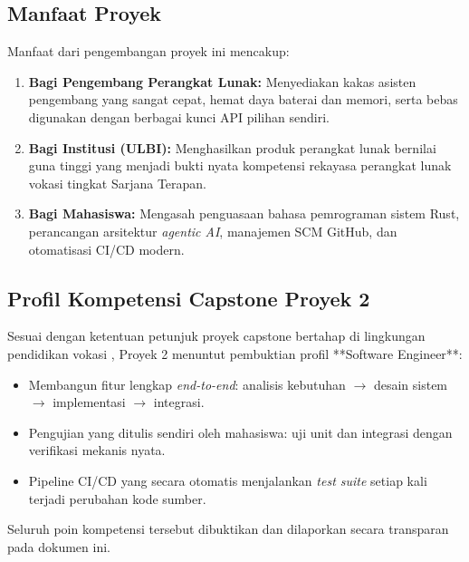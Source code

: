 \subsection{Manfaat Proyek}
Manfaat dari pengembangan proyek ini mencakup:
\begin{enumerate}
    \item \textbf{Bagi Pengembang Perangkat Lunak:} Menyediakan kakas asisten pengembang yang sangat cepat, hemat daya baterai dan memori, serta bebas digunakan dengan berbagai kunci API pilihan sendiri.
    \item \textbf{Bagi Institusi (ULBI):} Menghasilkan produk perangkat lunak bernilai guna tinggi yang menjadi bukti nyata kompetensi rekayasa perangkat lunak vokasi tingkat Sarjana Terapan.
    \item \textbf{Bagi Mahasiswa:} Mengasah penguasaan bahasa pemrograman sistem Rust, perancangan arsitektur \textit{agentic AI}, manajemen SCM GitHub, dan otomatisasi CI/CD modern.
\end{enumerate}

\subsection{Profil Kompetensi Capstone Proyek 2}
Sesuai dengan ketentuan petunjuk proyek capstone bertahap di lingkungan pendidikan vokasi \cite{awangga2024agentic}, Proyek 2 menuntut pembuktian profil **Software Engineer**:
\begin{itemize}
    \item Membangun fitur lengkap \textit{end-to-end}: analisis kebutuhan $\rightarrow$ desain sistem $\rightarrow$ implementasi $\rightarrow$ integrasi.
    \item Pengujian yang ditulis sendiri oleh mahasiswa: uji unit dan integrasi dengan verifikasi mekanis nyata.
    \item Pipeline CI/CD yang secara otomatis menjalankan \textit{test suite} setiap kali terjadi perubahan kode sumber.
\end{itemize}
Seluruh poin kompetensi tersebut dibuktikan dan dilaporkan secara transparan pada dokumen ini.
